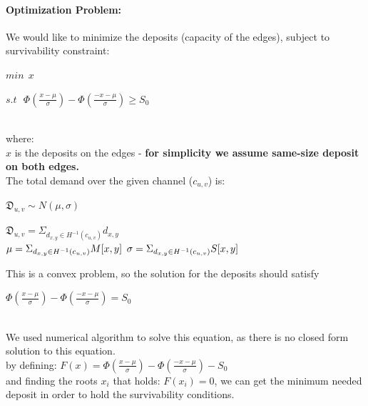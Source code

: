 \documentclass{cup-ino}
\begin{document}
\paragraph{Optimization Problem:}
We would like to minimize the deposits (capacity of the edges), subject to survivability constraint:
\begin{center}
$min \ \ x$

$ s.t \ \ \  \Phi(\frac{x -\mu}{\sigma}) - \Phi(\frac{-x -\mu}{\sigma}) \geq S_0 $
\end{center}
\\
where:\\
$x$ is the deposits on the edges - \textbf{for simplicity we assume same-size deposit on both edges.}\\
The total demand over the given channel ($c_{u,v}$) is:
\begin{center}
$\mathfrak{D}_{u,v} \sim N(\mu, \sigma) $ \\
\end{center}
 $\mathfrak{D}_{u,v} = \Sigma_{d_{x,y} \in H^{-1}(c_{u,v})} d_{x,y}$ \\
 $\mu = \Sigma_{d_{x,y} \in H^{-1}(c_{u,v})} M[x,y] \\$
 $\sigma = \Sigma_{d_{x,y} \in H^{-1}(c_{u,v})} S[x,y] \\$


This is a convex problem, so the solution for the deposits should satisfy
\begin{center}
$\Phi(\frac{x -\mu}{\sigma}) - \Phi(\frac{-x -\mu}{\sigma}) = S_0 $\\
\end{center}
\\
We used numerical algorithm to solve this equation, as there is no closed form solution to this equation.\\
by defining: $F(x) = \Phi(\frac{x -\mu}{\sigma}) - \Phi(\frac{-x -\mu}{\sigma}) - S_0$\\
and finding the roots $x_i$ that holds: $F(x_i) = 0$, we can get the minimum needed deposit in order to hold the survivability conditions.\\\\\\
\end{document}
